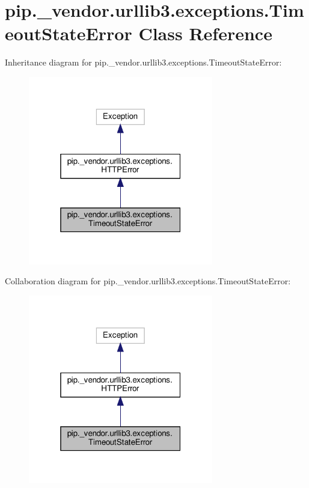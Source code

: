 \hypertarget{classpip_1_1__vendor_1_1urllib3_1_1exceptions_1_1TimeoutStateError}{}\section{pip.\+\_\+vendor.\+urllib3.\+exceptions.\+Timeout\+State\+Error Class Reference}
\label{classpip_1_1__vendor_1_1urllib3_1_1exceptions_1_1TimeoutStateError}


Inheritance diagram for pip.\+\_\+vendor.\+urllib3.\+exceptions.\+Timeout\+State\+Error\+:
\nopagebreak
\begin{figure}[H]
\begin{center}
\leavevmode
\includegraphics[width=229pt]{classpip_1_1__vendor_1_1urllib3_1_1exceptions_1_1TimeoutStateError__inherit__graph}
\end{center}
\end{figure}


Collaboration diagram for pip.\+\_\+vendor.\+urllib3.\+exceptions.\+Timeout\+State\+Error\+:
\nopagebreak
\begin{figure}[H]
\begin{center}
\leavevmode
\includegraphics[width=229pt]{classpip_1_1__vendor_1_1urllib3_1_1exceptions_1_1TimeoutStateError__coll__graph}
\end{center}
\end{figure}


